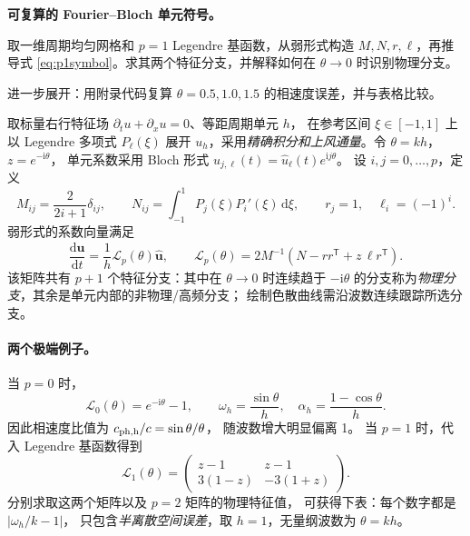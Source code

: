 \documentclass[UTF8,11pt,openany]{ctexbook}
\numberwithin{equation}{chapter}
\theoremstyle{definition}
\theoremstyle{remark}
\newcommand{\dd}{\mathrm d}
\begin{document}
\noindent\textbf{可复算的 Fourier--Bloch 单元符号。}\par
\begin{askai}
取一维周期均匀网格和 $p=1$ Legendre 基函数，从弱形式构造 $M,N,r,\ell$，再推导式 \eqref{eq:p1symbol}。求其两个特征分支，并解释如何在 $\theta\to0$ 时识别物理分支。

进一步展开：用附录代码复算 $\theta=0.5,1.0,1.5$ 的相速度误差，并与表格比较。
\end{askai}
取标量右行特征场
$\partial_tu+\partial_xu=0$、等距周期单元 $h$，
在参考区间 $\xi\in[-1,1]$ 上以 Legendre 多项式 $P_\ell(\xi)$
展开 $u_h$，采用\emph{精确积分和上风通量}。令
$\theta=kh$，$z=e^{-\mathrm i\theta}$，
单元系数采用 Bloch 形式
$u_{j,\ell}(t)=\widehat u_\ell(t)e^{\mathrm ij\theta}$。
设 $i,j=0,\ldots,p$，定义
\begin{equation}\label{eq:dgsymbol}
M_{ij}=\frac2{2i+1}\delta_{ij},\qquad
N_{ij}=\int_{-1}^1P_j(\xi)P_i'(\xi)\,\dd\xi,
\qquad
r_j=1,\quad\ell_i=(-1)^i.
\end{equation}
弱形式的系数向量满足
\begin{equation}\label{eq:dgsymboleig}
\frac{\dd\widehat{\bm u}}{\dd t}
=\frac1h\mathcal L_p(\theta)\widehat{\bm u},\qquad
\boxed{\mathcal L_p(\theta)=2M^{-1}\left(N-r r^\mathsf T
+z\,\ell r^\mathsf T\right).}
\end{equation}
该矩阵共有 $p+1$ 个特征分支：其中在 $\theta\to0$ 时连续趋于 $-\mathrm i\theta$
的分支称为\emph{物理分支}，其余是单元内部的非物理/高频分支；
绘制色散曲线需沿波数连续跟踪所选分支。

\paragraph{两个极端例子。}
当 $p=0$ 时，
\begin{equation}
\mathcal L_0(\theta)=e^{-\mathrm i\theta}-1,
\qquad
\omega_h=\frac{\sin\theta}{h},\quad
\alpha_h=\frac{1-\cos\theta}{h}.
\end{equation}
因此相速度比值为 $c_{\rm ph,h}/c=\sin\theta/\theta$，
随波数增大明显偏离 1。
当 $p=1$ 时，代入 Legendre 基函数得到
\begin{equation}\label{eq:p1symbol}
\mathcal L_1(\theta)=
\begin{pmatrix}z-1&z-1\\3(1-z)&-3(1+z)\end{pmatrix}.
\end{equation}
分别求取这两个矩阵以及 $p=2$ 矩阵的物理特征值，
可获得下表：每个数字都是 $|\omega_h/k-1|$，
只包含\emph{半离散空间误差}，取 $h=1$，无量纲波数为 $\theta=kh$。
\end{document}
